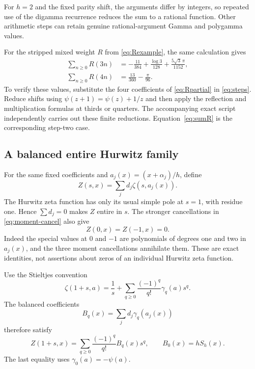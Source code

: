 For $h=2$ and the fixed parity shift, the arguments differ by integers, so repeated use of the digamma recurrence reduces the sum to a rational function. Other arithmetic steps can retain genuine rational-argument Gamma and polygamma values.

For the stripped mixed weight $R$ from \eqref{eq:Rexample}, the same calculation gives
\begin{align}
 \sum_{n\ge0}R(3n)&=-\frac{11}{384}+\frac{\log3}{128}
                         +\frac{5\sqrt3\,\pi}{1152},\label{eq:Rstep3}\\
 \sum_{n\ge0}R(4n)&=\frac{13}{360}-\frac{\pi}{96}.\label{eq:Rstep4}
\end{align}
To verify these values, substitute the four coefficients of \eqref{eq:Rpartial} in \eqref{eq:steps}. Reduce shifts using $\psi(z+1)=\psi(z)+1/z$ and then apply the reflection and multiplication formulas at thirds or quarters. The accompanying exact script independently carries out these finite reductions. Equation~\eqref{eq:sumR} is the corresponding step-two case.

\subsection{A balanced entire Hurwitz family}

For the same fixed coefficients and $a_j(x)=(x+\alpha_j)/h$, define
\begin{equation}\label{eq:Zbalanced}
 Z(s,x)=\sum_jd_j\zeta(s,a_j(x)).
\end{equation}
The Hurwitz zeta function has only its usual simple pole at $s=1$, with residue one. Hence $\sum d_j=0$ makes $Z$ entire in $s$. The stronger cancellations in \eqref{eq:moment-cancel} also give
\begin{equation}\label{eq:Zzeros}
 Z(0,x)=Z(-1,x)=0.
\end{equation}
Indeed the special values at $0$ and $-1$ are polynomials of degrees one and two in $a_j(x)$, and the three moment cancellations annihilate them. These are exact identities, not assertions about zeros of an individual Hurwitz zeta function.

Use the Stieltjes convention
\begin{equation}\label{eq:stieltjes}
 \zeta(1+s,a)=\frac1s+\sum_{q\ge0}\frac{(-1)^q}{q!}\gamma_q(a)s^q.
\end{equation}
The balanced coefficients
\[
 B_q(x)=\sum_jd_j\gamma_q(a_j(x))
\]
therefore satisfy
\begin{equation}\label{eq:balanced-Laurent}
 Z(1+s,x)=\sum_{q\ge0}\frac{(-1)^q}{q!}B_q(x)s^q,
 \qquad B_0(x)=hS_h(x).
\end{equation}
The last equality uses $\gamma_0(a)=-\psi(a)$.

